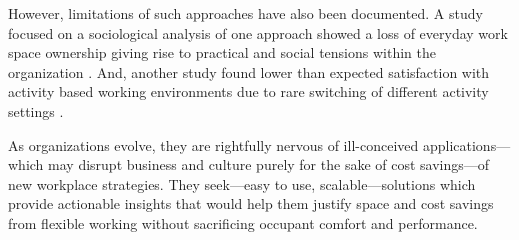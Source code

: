 \documentclass[]{interact}
\theoremstyle{plain}%
\theoremstyle{definition}
\theoremstyle{remark}
\begin{document}
However, limitations of such approaches have also been documented. A study focused on a sociological analysis of one approach showed a loss of everyday work space ownership giving rise to practical and social tensions within the organization \cite{Hirst2011SettlersHot-desking}. And, another study found lower than expected satisfaction with activity based working environments due to rare switching of different activity settings \citep{Hoendervanger2016FlexibilityEnvironments}. 


As organizations evolve, they are rightfully nervous of ill-conceived applications---which may disrupt business and culture purely for the sake of cost savings---of new workplace strategies. They seek---easy to use, scalable---solutions which provide actionable insights that would help them justify space and cost savings from flexible working without sacrificing occupant comfort and performance. 



\end{document}
